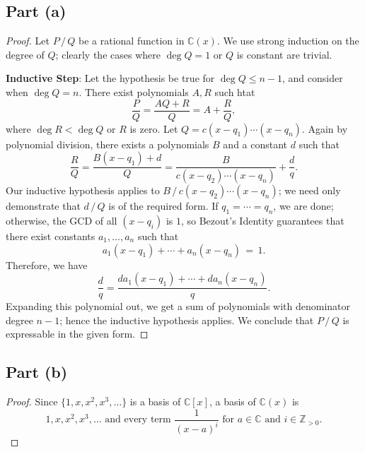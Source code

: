 \documentclass[11pt]{article}
\begin{document}

\subsection*{Part (a)}
\begin{proof}
  Let $P \, / \, Q$ be a rational function in $\mathbb{C}(x)$. We use strong induction on the degree of $Q$; clearly the cases where $\deg Q = 1$ or $Q$ is constant are trivial.
  
  \textbf{Inductive Step}: Let the hypothesis be true for $\deg Q \le n - 1$, and consider when $\deg Q = n$. There exist polynomials $A, R$ such htat
  \[
    \frac{P}{Q} = \frac{AQ + R}{Q} = A + \frac{R}{Q},
  \]
  where $\deg R < \deg Q$ or $R$ is zero. Let $Q = c(x - q_{1}) \cdots (x - q_{n})$. Again by polynomial division, there exists a polynomials $B$ and a constant $d$ such that
  \[
    \frac{R}{Q} = \frac{B(x - q_{1}) + d}{Q} = \frac{B}{c(x - q_{2}) \cdots (x - q_{n})} + \frac{d}{q}.
  \]
  Our inductive hypothesis applies to $B \, / \, c(x - q_{2}) \cdots (x - q_{n})$; we need only demonstrate that $d \, / \, Q$ is of the required form. If $q_{1} = \cdots = q_{n}$, we are done; otherwise, the GCD of all $(x - q_{i})$ is $1$, so Bezout's Identity guarantees that there exist constants $a_{1}, \ldots, a_{n}$ such that
  \[
    a_{1}(x - q_{1}) + \cdots + a_{n}(x - q_{n}) \, = \, 1.
  \]
  Therefore, we have
  \[
    \frac{d}{q} = \frac{da_{1} (x - q_{1}) + \cdots + da_{n}(x - q_{n})}{q}.
  \]
  Expanding this polynomial out, we get a sum of polynomials with denominator degree $n - 1$; hence the inductive hypothesis applies. We conclude that $P \, / \, Q$ is expressable in the given form.
\end{proof}


\subsection*{Part (b)}

\begin{proof}
  Since $\{ 1, x, x^{2}, x^{3}, \ldots \}$ is a basis of $\mathbb{C}[x]$, a basis of $\mathbb{C}(x)$ is
  \[
    \boxed{\text{$1, x, x^{2}, x^{3}, \ldots$ and every term $\frac{1}{(x - a)^{i}}$ for $a \in \mathbb{C}$ and $i \in \mathbb{Z}_{> 0}$}}.
  \]
\end{proof}


\end{document}
